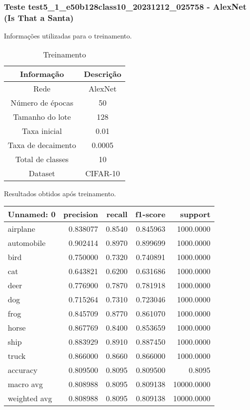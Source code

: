 \subsubsection{Teste test5_1_e50b128class10_20231212_025758 - AlexNet (Is That a Santa)}

Informações utilizadas para o treinamento.

\begin{table}[ht]
   \centering
   \caption{Treinamento}
   \label{tab:modelos}
   \begin{tabular}{| c | c | }
      \hline 
      \textbf{Informação} & \textbf{Descrição} \\
      \hline \hline 
      Rede & AlexNet \\
      \hline
      Número de épocas & 50\\
      \hline
      Tamanho do lote & 128\\
      \hline
      Taxa inicial & 0.01 \\
      \hline
      Taxa de decaimento & 0.0005 \\
      \hline
      Total de classes & 10\\
      \hline
      Dataset & CIFAR-10\\
      \hline
   \end{tabular} 
\end{table}

Resultados obtidos após treinamento.

\begin{tabular}{lrrrr}
\toprule
  Unnamed: 0 &  precision &  recall &  f1-score &    support \\
\midrule
    airplane &   0.838077 &  0.8540 &  0.845963 &  1000.0000 \\
  automobile &   0.902414 &  0.8970 &  0.899699 &  1000.0000 \\
        bird &   0.750000 &  0.7320 &  0.740891 &  1000.0000 \\
         cat &   0.643821 &  0.6200 &  0.631686 &  1000.0000 \\
        deer &   0.776900 &  0.7870 &  0.781918 &  1000.0000 \\
         dog &   0.715264 &  0.7310 &  0.723046 &  1000.0000 \\
        frog &   0.845709 &  0.8770 &  0.861070 &  1000.0000 \\
       horse &   0.867769 &  0.8400 &  0.853659 &  1000.0000 \\
        ship &   0.883929 &  0.8910 &  0.887450 &  1000.0000 \\
       truck &   0.866000 &  0.8660 &  0.866000 &  1000.0000 \\
    accuracy &   0.809500 &  0.8095 &  0.809500 &     0.8095 \\
   macro avg &   0.808988 &  0.8095 &  0.809138 & 10000.0000 \\
weighted avg &   0.808988 &  0.8095 &  0.809138 & 10000.0000 \\
\bottomrule
\end{tabular}


